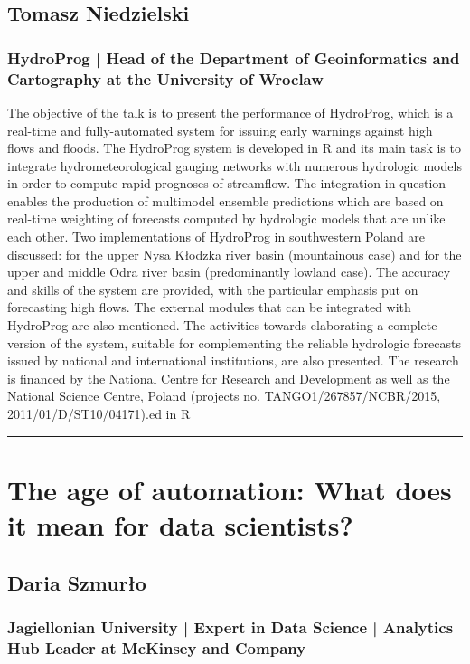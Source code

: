 \documentclass [12pt]{article}
\begin{document}
\subsection*{Tomasz Niedzielski}
\subsubsection*{HydroProg | Head of the Department of Geoinformatics and Cartography at the University of Wroclaw}
The objective of the talk is to present the performance of HydroProg, which is a real-time and fully-automated system for issuing early warnings against high flows and floods. The HydroProg system is developed in R and its main task is to integrate hydrometeorological gauging networks with numerous hydrologic models in order to compute rapid prognoses of streamflow. The integration in question enables the production of multimodel ensemble predictions which are based on real-time weighting of forecasts computed by hydrologic models that are unlike each other. Two implementations of HydroProg in southwestern Poland are discussed: for the upper Nysa Kłodzka river basin (mountainous case) and for the upper and middle Odra river basin (predominantly lowland case). The accuracy and skills of the system are provided, with the particular emphasis put on forecasting high flows. The external modules that can be integrated with HydroProg are also mentioned. The activities towards elaborating a complete version of the system, suitable for complementing the reliable hydrologic forecasts issued by national and international institutions, are also presented. The research is financed by the National Centre for Research and Development as well as the National Science Centre, Poland (projects no. TANGO1/267857/NCBR/2015, 2011/01/D/ST10/04171).ed in R

\noindent\rule{\textwidth}{1pt}
\section{The age of automation: What does it mean for data scientists?}
\subsection*{Daria Szmurło}
\subsubsection*{Jagiellonian University | Expert in Data Science | Analytics Hub Leader at McKinsey and Company}
\end{document}
